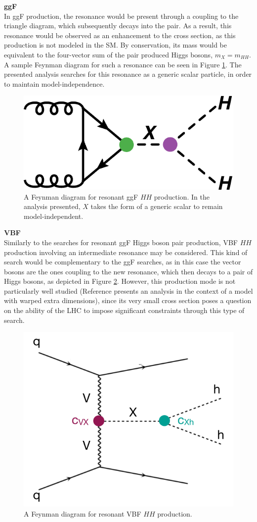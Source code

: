 \noindent\textbf{\gls{ggF}}\\
\indent In \gls{ggF} production, the resonance would be present through a coupling to the triangle diagram, which subsequently decays into the \hh pair. As a result, this resonance would be observed as an enhancement to the \hh cross section, as this production is not modeled in the \gls{SM}. By conservation, its mass would be equivalent to the four-vector sum of the pair produced Higgs bosons, $m_{X} = m_{HH}$. A sample Feynman diagram for such a resonance can be seen in Figure \ref{fig:ggf-resonant}. The presented analysis searches for this resonance as a generic scalar particle, in order to maintain model-independence.


\begin{figure}[!ht]
    \centering
    \includegraphics[width=.45\textwidth]{chapters/chapter1_theory/images/hh_res_ggf.pdf}
    \caption{A Feynman diagram for resonant ggF  $HH$ production. In the analysis presented, $X$ takes the form of a generic scalar to remain model-independent.}
    \label{fig:ggf-resonant}
\end{figure}

\noindent\textbf{VBF}\\
\indent Similarly to the searches for resonant ggF Higgs boson pair production, \gls{VBF} $HH$
production involving an intermediate resonance may be considered. This kind of search would be complementary to the ggF searches, as in this case the vector bosons are the ones coupling to the new resonance, which then decays to a pair of Higgs bosons, as depicted in Figure \ref{fig:vbf-resonant}. However, this production mode is not
particularly well studied (Reference \cite{res_vbf} presents an analysis in the context of a model with warped extra dimensions), since its very small cross section poses a question on the ability of the LHC to impose significant constraints through this type of search.

\begin{figure}[!ht]
    \centering
    \includegraphics[width=.45\textwidth]{chapters/chapter1_theory/images/vbf_resonant.png}
    \caption{A Feynman diagram for resonant VBF $HH$ production.}
    \label{fig:vbf-resonant}
\end{figure}


